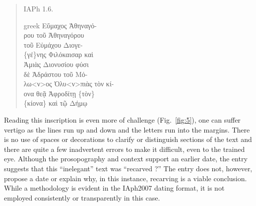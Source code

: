 \documentclass[amsthm,ebook]{saparticle}
\begin{document}
\begin{quotation}
\noindent IAPh 1.6.\\
\begin{otherlanguage*}{greek}
\noindent Εὔμαχος Ἀθηναγό-\\
ρου τοῦ Ἀθηναγόρου\\
τοῦ Εὐμάχου Διογε-\\
\{γέ\}νης Φιλόκαισαρ καὶ\\
  Ἀμιὰς Διονυσίου φύσι\\
δὲ Ἀδράστου τοῦ Μό-\\
λω\textlatin{<}ν\textlatin{>}ος Ὀλυ\textlatin{<}ν\textlatin{>}πιὰς τὸν κί-\\
ονα θεᾷ Ἀφροδίτῃ \{τὸν\}\\
\{κίονα\} καὶ τῷ Δήμῳ
\end{otherlanguage*}
\end{quotation}


Reading this inscription is even more of challenge (Fig.~\ref{fig:5}), one can suffer vertigo as the
lines run up and down and the letters run into the margins. There is no use of spaces or decorations to clarify or
distinguish sections of the text and there are quite a few inadvertent errors to make it difficult, even to the trained
eye. Although the prosopography and context support an earlier date, the entry suggests that this ``inelegant'' text was
``recarved ?'' The entry does not, however, propose a date or explain why, in this instance, recarving is a viable
conclusion. While a methodology is evident in the IAph2007 dating format, it is not employed consistently or
transparently in this case. 
\end{document}
